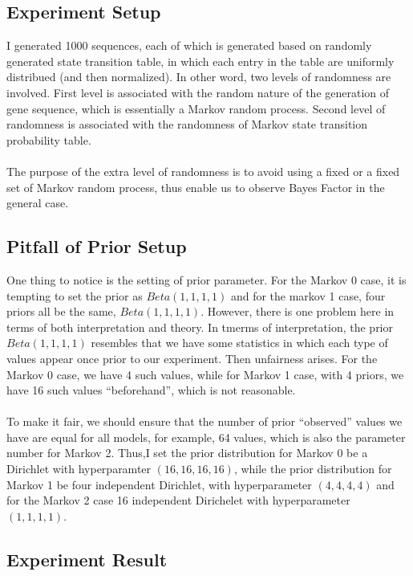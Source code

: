 \documentclass[paper=a4, fontsize=11pt]{scrartcl} %
\numberwithin{equation}{section} %
\numberwithin{figure}{section} %
\numberwithin{table}{section} %
\begin{document}
\subsection {Experiment Setup}

I generated 1000 sequences, each of which is generated based on randomly generated state transition table, in which each entry in the table are uniformly distribued (and then normalized). In other word, two levels of randomness are involved. First level is associated with the random nature of the generation of gene sequence, which is essentially a Markov random process. Second level of randomness is associated with the randomness of Markov state transition probability table. 
\\\\ 
The purpose of the extra level of randomness is to avoid using a fixed or a fixed set of Markov random process, thus enable us to observe Bayes Factor in the general case.

\subsection {Pitfall of Prior Setup}
One thing to notice is the setting of prior parameter. For the Markov 0 case, it is tempting to set the prior as $Beta (1, 1, 1, 1)$ and for the markov 1 case, four priors all be the same, $Beta (1, 1, 1, 1)$. However, there is one problem here in terms of both interpretation and theory. In tmerms of interpretation, the prior $Beta (1,1,1,1)$  resembles that we have some statistics in which each type of values appear once prior to our experiment. Then unfairness arises. For the Markov 0 case, we have 4 such values, while for Markov 1 case, with 4 priors, we have 16 such values ``beforehand'', which is not reasonable. 
\\\\
To make it fair, we should ensure that the number of prior ``observed'' values we have are equal for all models, for example, 64 values, which is also the parameter number for Markov 2. Thus,I set the prior distribution for Markov 0 be a Dirichlet with hyperparamter $(16, 16, 16, 16)$, while the prior distribution for Markov 1 be four independent Dirichlet, with hyperparameter $(4,4,4,4)$ and for the Markov 2 case 16 independent Dirichelet with hyperparameter $(1,1,1,1)$.

\subsection {Experiment Result}
\end{document}
